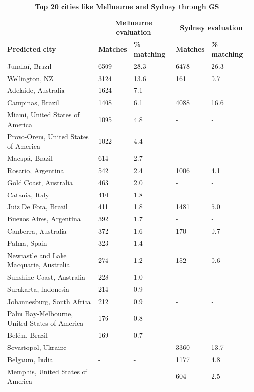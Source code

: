 \documentclass[10pt,letterpaper]{article}
\begin{document}
\begin{table}[!htbp]
\begin{adjustwidth}{-2.25in}{0in}
\caption{\bf Top 20 cities like Melbourne and Sydney through GS \label{tab:melbournesydneyGS}}     
\begin{tabular}{ l  l l l  l}
 \hline    &  \multicolumn{2}{c}{\textbf{Melbourne evaluation}} & \multicolumn{2}{c}{\textbf{Sydney evaluation}}  \\  
\textbf{Predicted city} & \textbf{Matches} & \textbf{\% matching}  & \textbf{Matches} & \textbf{\% matching}\\ \hline
Jundia\'{i}, Brazil & 6509 & 28.3 & 6478 & 26.3 \\ 
Wellington, NZ & 3124 & 13.6 & 161 & 0.7 \\ 
Adelaide, Australia & 1624 & 7.1 &-&- \\ 
Campinas, Brazil & 1408 & 6.1 & 4088 & 16.6 \\ 
Miami, United States of America & 1095 & 4.8 &-&- \\ 
Provo-Orem, United States of America & 1022 & 4.4 &-&- \\ 
Macap\'{a}, Brazil & 614 & 2.7 &-&- \\ 
Rosario, Argentina & 542 & 2.4 & 1006 & 4.1 \\ 
Gold Coast, Australia & 463 & 2.0 &-&- \\ 
Catania, Italy & 410 & 1.8 &-&- \\ 
Juiz De Fora, Brazil & 411 & 1.8 & 1481 & 6.0 \\ 
Buenos Aires, Argentina & 392 & 1.7 &-&- \\ 
Canberra, Australia & 372 & 1.6 & 170 & 0.7 \\ 
Palma, Spain & 323 & 1.4 &-&- \\ 
Newcastle and Lake Macquarie, Australia & 274 & 1.2 & 152 & 0.6 \\ 
Sunshine Coast, Australia & 228 & 1.0 &-&- \\ 
Surakarta, Indonesia & 214 & 0.9 &-&- \\ 
Johannesburg, South Africa & 212 & 0.9 &-&- \\ 
Palm Bay-Melbourne, United States of America & 176 & 0.8 &-&- \\ 
Bel\'{e}m, Brazil & 169 & 0.7 &-&- \\ 
Sevastopol, Ukraine &-&- & 3360 & 13.7\\ 
Belgaum, India &-&- & 1177 & 4.8\\ 
Memphis, United States of America &-&- & 604 & 2.5\\ 

\end{tabular}
\end{adjustwidth}
\end{table}
\end{document}
